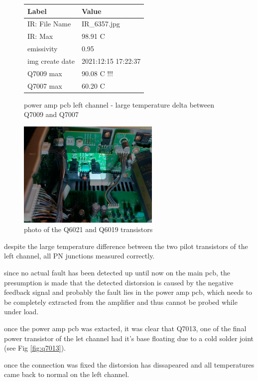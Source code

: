 \documentclass[a4paper,twoside]{report}
\begin{document}
\begin{figure}[hptb!]
 \vspace*{5mm}
 \begin{tabular}{ l | l }
  Label & Value \\ \hline
  IR: File Name & IR\_6357.jpg \\
  IR: Max & 98.91 C \\
  emissivity & 0.95 \\
  img create date & 2021:12:15 17:22:37 \\
  Q7009 max & 90.08 C !!! \\
  Q7007 max & 60.20 C \\
 \end{tabular}

 \caption{power amp pcb left channel - large temperature delta between Q7009 and Q7007}
 \label{tab:pwr-pcb-l-ir}
\end{figure}

\begin{figure}[hptb!]
\centering
 \includegraphics[width=6.8cm, keepaspectratio=true]{img_report/power_amp_pcb_l}
 \caption{photo of the Q6021 and Q6019 transistors}
\end{figure}

despite the large temperature difference between the two pilot transistors of the left channel, all PN junctions measured correctly.

since no actual fault has been detected up until now on the main pcb, the presumption is made that the detected distorsion is caused by the negative feedback signal and probably the fault lies in the power amp pcb, which needs to be completely extracted from the amplifier and thus cannot be probed while under load.

once the power amp pcb was extacted, it was clear that Q7013, one of the final power transistor of the let channel had it's base floating due to a cold solder joint (see Fig \ref{fig:q7013}).

once the connection was fixed the distorsion has dissapeared and all temperatures came back to normal on the left channel.
\end{document}
